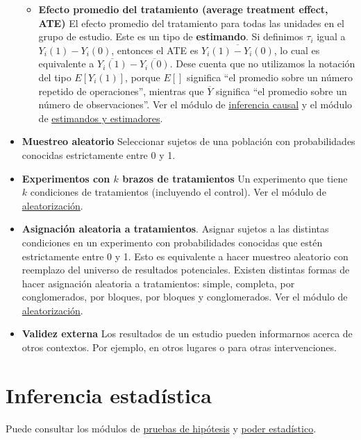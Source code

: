 \documentclass[12pt,spanish,]{book}
\providecommand{\tightlist}{%
  \setlength{\itemsep}{0pt}\setlength{\parskip}{0pt}}
\begin{document}
\begin{itemize}
  \begin{itemize}
  \tightlist
  \item
    \textbf{Efecto promedio del tratamiento (average treatment effect, ATE)} El efecto promedio del tratamiento para todas las unidades en el grupo de estudio. Este es un tipo de \textbf{estimando}. Si definimos \(\tau_i\) igual a \(Y_i(1)-Y_i(0)\), entonces el ATE es \(\overline{Y_i(1)-Y_i(0)}\), lo cual es equivalente a \(\overline{{Y}_i(1)}-\overline{{Y}_i(0)}\). Dese cuenta que no utilizamos la notación del tipo \(E[Y_i (1)]\), porque \(E[]\) significa ``el promedio sobre un número repetido de operaciones'', mientras que \(\overline{Y}\) significa ``el promedio sobre un número de observaciones''. Ver el módulo de \href{inferencia-causal.html}{inferencia causal} y el módulo de \href{estimandos-y-estimadores.html}{estimandos y estimadores}.
  \end{itemize}
\item
  \textbf{Muestreo aleatorio} Seleccionar sujetos de una población con
  probabilidades conocidas estrictamente entre 0 y 1.
\item
  \textbf{Experimentos con \(k\) brazos de tratamientos} Un experimento que tiene \(k\) condiciones de tratamientos
  (incluyendo el control). Ver el módulo de \href{aleatorizaciónn.html}{aleatorización}.
\item
  \textbf{Asignación aleatoria a tratamientos}. Asignar sujetos a las distintas condiciones en un experimento con probabilidades conocidas que estén estrictamente entre 0 y 1. Esto es equivalente a hacer muestreo aleatorio con reemplazo del universo de resultados potenciales. Existen distintas formas de hacer asignación aleatoria a tratamientos: simple, completa, por conglomerados, por bloques, por bloques y conglomerados. Ver el módulo de \href{aleatorización.html}{aleatorización}.
\item
  \textbf{Validez externa} Los resultados de un estudio pueden informarnos acerca de otros contextos. Por ejemplo, en otros lugares o para otras intervenciones.
\end{itemize}

\hypertarget{inferencia-estaduxedstica}{%
\section{Inferencia estadística}\label{inferencia-estaduxedstica}}

Puede consultar los módulos de \href{pruebas-de-hipótesis.html}{pruebas de hipótesis} y \href{poder-estadístico-y-diagnosticandos-del-diseño.html}{poder estadístico}.
\end{document}
